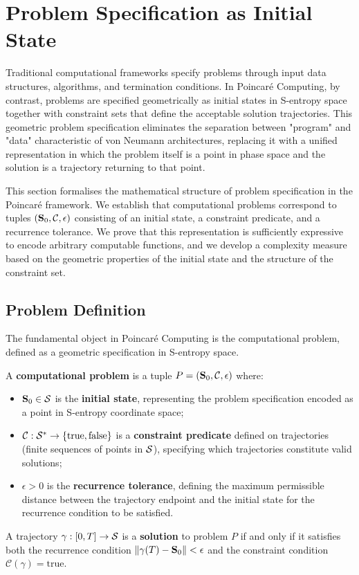 \section{Problem Specification as Initial State}
\label{sec:initial_state}

Traditional computational frameworks specify problems through input data structures, algorithms, and termination conditions. In Poincaré Computing, by contrast, problems are specified geometrically as initial states in S-entropy space together with constraint sets that define the acceptable solution trajectories. This geometric problem specification eliminates the separation between "program" and "data" characteristic of von Neumann architectures, replacing it with a unified representation in which the problem itself is a point in phase space and the solution is a trajectory returning to that point.

This section formalises the mathematical structure of problem specification in the Poincaré framework. We establish that computational problems correspond to tuples $(\mathbf{S}_0, \mathcal{C}, \epsilon)$ consisting of an initial state, a constraint predicate, and a recurrence tolerance. We prove that this representation is sufficiently expressive to encode arbitrary computable functions, and we develop a complexity measure based on the geometric properties of the initial state and the structure of the constraint set.

\subsection{Problem Definition}

The fundamental object in Poincaré Computing is the computational problem, defined as a geometric specification in S-entropy space.

\begin{definition}
\label{def:computational_problem}
A \textbf{computational problem} is a tuple $P = (\mathbf{S}_0, \mathcal{C}, \epsilon)$ where:
\begin{itemize}
    \item $\mathbf{S}_0 \in \mathcal{S}$ is the \textbf{initial state}, representing the problem specification encoded as a point in S-entropy coordinate space;
    \item $\mathcal{C}: \mathcal{S}^* \to \{\text{true}, \text{false}\}$ is a \textbf{constraint predicate} defined on trajectories (finite sequences of points in $\mathcal{S}$), specifying which trajectories constitute valid solutions;
    \item $\epsilon > 0$ is the \textbf{recurrence tolerance}, defining the maximum permissible distance between the trajectory endpoint and the initial state for the recurrence condition to be satisfied.
\end{itemize}
A trajectory $\gamma: [0,T] \to \mathcal{S}$ is a \textbf{solution} to problem $P$ if and only if it satisfies both the recurrence condition $\|\gamma(T) - \mathbf{S}_0\| < \epsilon$ and the constraint condition $\mathcal{C}(\gamma) = \text{true}$.
\end{definition}

